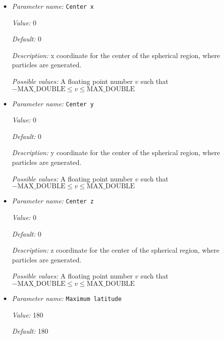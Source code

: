 \begin{itemize}
\item {\it Parameter name:} {\tt Center x}
\label{parameters:Postprocess/Particles/Generator/Uniform radial/Center x}


{\it Value:} 0


{\it Default:} 0


{\it Description:} x coordinate for the center of the spherical region, where particles are generated.


{\it Possible values:} A floating point number $v$ such that $-\text{MAX\_DOUBLE} \leq v \leq \text{MAX\_DOUBLE}$
\item {\it Parameter name:} {\tt Center y}
\label{parameters:Postprocess/Particles/Generator/Uniform radial/Center y}


{\it Value:} 0


{\it Default:} 0


{\it Description:} y coordinate for the center of the spherical region, where particles are generated.


{\it Possible values:} A floating point number $v$ such that $-\text{MAX\_DOUBLE} \leq v \leq \text{MAX\_DOUBLE}$
\item {\it Parameter name:} {\tt Center z}
\label{parameters:Postprocess/Particles/Generator/Uniform radial/Center z}


{\it Value:} 0


{\it Default:} 0


{\it Description:} z coordinate for the center of the spherical region, where particles are generated.


{\it Possible values:} A floating point number $v$ such that $-\text{MAX\_DOUBLE} \leq v \leq \text{MAX\_DOUBLE}$
\item {\it Parameter name:} {\tt Maximum latitude}
\label{parameters:Postprocess/Particles/Generator/Uniform radial/Maximum latitude}


{\it Value:} 180


{\it Default:} 180



\end{itemize}
